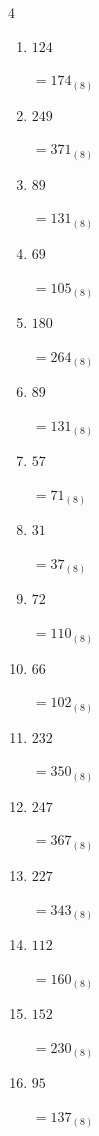 \begin{multicols}{4}
\begin{enumerate}
  \item $124$

        $=174_{(8)}$

\columnbreak %

  \item $249$

        $=371_{(8)}$

  \item $89$

        $=131_{(8)}$

  \item $69$

        $=105_{(8)}$

  \item $180$

        $=264_{(8)}$

  \item $89$

        $=131_{(8)}$

  \item $57$

        $=71_{(8)}$

  \item $31$

        $=37_{(8)}$

  \item $72$

        $=110_{(8)}$

  \item $66$

        $=102_{(8)}$

  \item $232$

        $=350_{(8)}$

  \item $247$

        $=367_{(8)}$

  \item $227$

        $=343_{(8)}$

  \item $112$

        $=160_{(8)}$

  \item $152$

        $=230_{(8)}$

  \item $95$

        $=137_{(8)}$

\columnbreak %


\end{enumerate}
\end{multicols}
